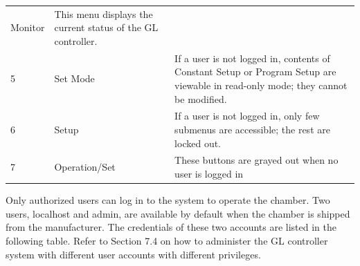 \begin{longtable}[]{@{}|l|l|l|@{}}
\begin{minipage}[t]{0.23\columnwidth}
Monitor\strut
\end{minipage} & \begin{minipage}[t]{0.65\columnwidth}\raggedright
This menu displays the current status of the GL controller.\strut
\end{minipage}\tabularnewline
\begin{minipage}[t]{0.04\columnwidth}\raggedright
5\strut
\end{minipage} & \begin{minipage}[t]{0.23\columnwidth}\raggedright
Set Mode\strut
\end{minipage} & \begin{minipage}[t]{0.65\columnwidth}\raggedright
If a user is not logged in, contents of Constant Setup or Program Setup
are viewable in read-only mode; they cannot be modified.\strut
\end{minipage}\tabularnewline
\begin{minipage}[t]{0.04\columnwidth}\raggedright
6\strut
\end{minipage} & \begin{minipage}[t]{0.23\columnwidth}\raggedright
Setup\strut
\end{minipage} & \begin{minipage}[t]{0.65\columnwidth}\raggedright
If a user is not logged in, only few submenus are accessible; the rest
are locked out.\strut
\end{minipage}\tabularnewline
\begin{minipage}[t]{0.04\columnwidth}\raggedright
7\strut
\end{minipage} & \begin{minipage}[t]{0.23\columnwidth}\raggedright
Operation/Set\strut
\end{minipage} & \begin{minipage}[t]{0.65\columnwidth}\raggedright
These buttons are grayed out when no user is logged in\strut
\end{minipage}\tabularnewline
\bottomrule
\end{longtable}

Only authorized users can log in to the system to operate the chamber.
Two users, localhost and admin, are available by default when the
chamber is shipped from the manufacturer. The credentials of these two
accounts are listed in the following table. Refer to Section 7.4 on how
to administer the GL controller system with different user accounts with
different privileges.

